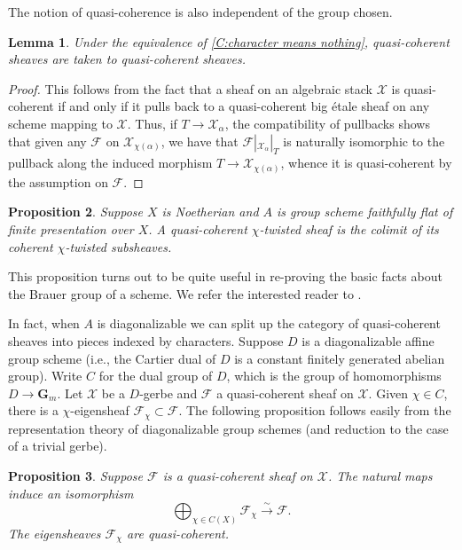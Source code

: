 \documentclass[11pt]{amsart}
\newcommand{\field}[1]{\mathbf #1}
\newcommand{\ms}[1]{\mathscr #1}
\newcommand{\simto}{\stackrel{\sim}{\to}}
\newcommand{\G}{\field G} %
\renewcommand{\[}{[\!\hspace{0.03em}[}
\renewcommand{\]}{]\!\hspace{0.03em}]}
\renewcommand{\(}{(\!\hspace{0.03em}(}
\renewcommand{\)}{)\!\hspace{0.03em})}
\newtheorem{lem}{Lemma}[subsubsection]%
\newtheorem{prop}[lem]{Proposition}
\theoremstyle{definition}
\theoremstyle{remark}
\begin{document}
The notion of quasi-coherence is also independent of the group chosen.

\begin{lem}\label{L:quasi-coherent is unambiguous} Under the equivalence of \ref{C:character means 
nothing}, quasi-coherent sheaves are taken to quasi-coherent sheaves. 
\end{lem}
\begin{proof} This follows from the fact that a sheaf on an algebraic stack $\ms X$ is 
quasi-coherent if and only if it pulls back to a quasi-coherent 
big \'etale sheaf on any scheme mapping to $\ms X$.  Thus, if $T\to\ms X_{\alpha}$, the compatibility of pullbacks shows that given any $\ms F$ on $\ms X_{\chi(\alpha)}$, we have that $\ms F|_{\ms X_{\alpha}}|_T$ is naturally isomorphic to the pullback along the induced morphism $T\to\ms X_{\chi(\alpha)}$, whence it is quasi-coherent by the assumption on $\ms F$.
\end{proof}


\begin{prop}\label{C:colimit} Suppose $X$ is Noetherian and $A$ is 
group scheme faithfully flat of finite presentation over $X$.  A quasi-coherent $\chi$-twisted 
sheaf is the colimit of its coherent $\chi$-twisted subsheaves.
\end{prop}
This proposition turns out to be quite useful in re-proving the basic 
facts about the Brauer group of a scheme.  We refer the interested 
reader to \cite{period-index-paper}.

In fact, when $A$ is diagonalizable we can split up the category of quasi-coherent 
sheaves into pieces indexed by characters.  Suppose $D$ is a diagonalizable affine group scheme (i.e., the 
Cartier dual of $D$ is a constant finitely generated abelian group).  
Write $C$ for the dual group of $D$, which is the group of 
homomorphisms $D\to\G_{m}$.  Let $\ms X$ be a $D$-gerbe and $\ms F$ a 
quasi-coherent sheaf on $\ms X$.  Given $\chi\in C$, there is a 
$\chi$-eigensheaf $\ms F_{\chi}\subset\ms F$.  The following proposition follows easily from the representation theory of diagonalizable group schemes (and reduction to the case of a trivial gerbe).

\begin{prop}\label{P:q-coh splits}  Suppose $\ms F$ is a 
quasi-coherent sheaf on $\ms X$.  The natural maps induce an 
isomorphism
$$\bigoplus_{\chi\in C(X)}\ms F_{\chi}\simto\ms F.$$
The eigensheaves $\ms F_{\chi}$ are quasi-coherent.
\end{prop}
\end{document}
